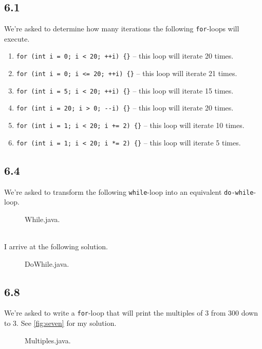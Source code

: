 \documentclass[leqno, 11pt]{article}
\begin{document}
\subsection*{6.1}
We're asked to determine how many iterations the following \texttt{for}-loops will execute.
\begin{enumerate}[label=\alph*.]
  \itemsep-0.3em
  \item \texttt{for (int i = 0; i < 20; ++i) \{\}} -- this loop will iterate 20 times.
  \item \texttt{for (int i = 0; i <= 20; ++i) \{\}} -- this loop will iterate 21 times.
  \item \texttt{for (int i = 5; i < 20; ++i) \{\}} -- this loop will iterate 15 times.
  \item \verb|for (int i = 20; i > 0; --i) {}| -- this loop will iterate 20 times.
  \item \texttt{for (int i = 1; i < 20; i += 2) \{\}} -- this loop will iterate 10 times.
  \item \texttt{for (int i = 1; i < 20; i *= 2) \{\}} -- this loop will iterate 5 times.
\end{enumerate}
\subsection*{6.4}
We're asked to transform the following \texttt{while}-loop into an equivalent \texttt{do-while}-loop.
\begin{figure}[h!]
  \centering
  
  \caption{While.java.}
  \label{fig:five}
\end{figure}\\
I arrive at the following solution.
\begin{figure}[h!]
  \centering
  
  \caption{DoWhile.java.}
  \label{fig:six}
\end{figure}
\subsection*{6.8}
We're asked to write a \texttt{for}-loop that will print the multiples of $3$ from $300$ down to $3$. See \autoref{fig:seven} for my solution.
\begin{figure}[h!]
  \centering
  
  \caption{Multiples.java.}
  \label{fig:seven}
\end{figure}
\end{document}
